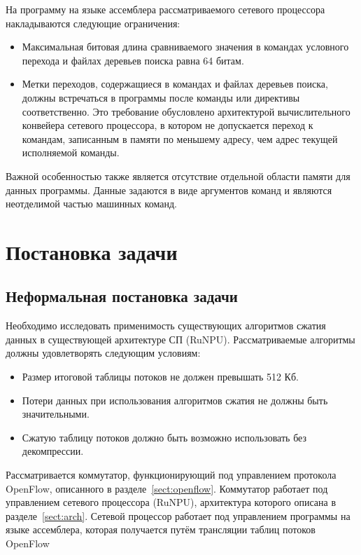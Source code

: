\documentclass[oneside,final,12pt]{extarticle}
\begin{document}
            На программу на языке ассемблера рассматриваемого сетевого процессора накладываются 
            следующие ограничения:
            \begin{itemize}
                \item Максимальная битовая длина сравниваемого значения в командах условного перехода 
                    и файлах деревьев поиска равна 64 битам.
                \item Метки переходов, содержащиеся в командах и файлах деревьев поиска, 
                    должны встречаться в программы после команды или директивы соответственно. 
                    Это требование обусловлено архитектурой вычислительного конвейера сетевого 
                    процессора, в котором не допускается переход к командам, 
                    записанным в памяти по меньшему адресу, чем адрес текущей исполняемой команды.
            \end{itemize}

            Важной особенностью также является отсутствие отдельной области памяти для данных программы. 
            Данные задаются в виде аргументов команд и являются неотделимой частью машинных команд.

    \section{Постановка задачи}
    \subsection{Неформальная постановка задачи}
        Необходимо исследовать применимость существующих алгоритмов сжатия данных в существующей архитектуре СП (RuNPU).
        Рассматриваемые алгоритмы должны удовлетворять следующим условиям:
        \begin{itemize}
            \item Размер итоговой таблицы потоков не должен превышать 512 Кб.
            \item Потери данных при использования алгоритмов сжатия не должны быть значительными.
            \item Сжатую таблицу потоков должно быть возможно использовать без декомпрессии.
        \end{itemize}
    \fi
    Рассматривается коммутатор, функционирующий под управлением протокола OpenFlow,
    описанного в разделе~\ref{sect:openflow}. Коммутатор работает под управлением сетевого
    процессора (RuNPU), архитектура которого описана в разделе~\ref{sect:arch}.
    Сетевой процессор работает под управлением программы на языке ассемблера, которая получается 
    путём трансляции таблиц потоков OpenFlow
\end{document}
